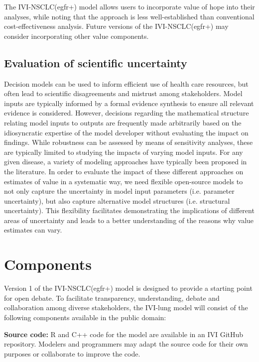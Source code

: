 \documentclass[11pt,final,fleqn]{article}\usepackage[]{graphicx}\usepackage[]{color}
\theoremstyle{plain}
\begin{document}
{The IVI-NSCLC(egfr+) model allows users to incorporate value of hope into their analyses, while noting that the approach is less well-established than conventional cost-effectiveness analysis. Future versions of the IVI-NSCLC(egfr+) may consider incorporating other value components.


\subsection{Evaluation of scientific uncertainty}
Decision models can be used to inform efficient use of health care resources, but often lead to scientific disagreements and mistrust among stakeholders. Model inputs are typically informed by a formal evidence synthesis to ensure all relevant evidence is considered. However, decisions regarding the mathematical structure relating model inputs to outputs are frequently made arbitrarily based on the idiosyncratic expertise of the model developer without evaluating the impact on findings. While robustness can be assessed by means of sensitivity analyses, these are typically limited to studying the impacts of varying model inputs. For any given disease, a variety of modeling approaches have typically been proposed in the literature. In order to evaluate the impact of these different approaches on estimates of value in a systematic way, we need flexible open-source models to not only capture the uncertainty in model input parameters (i.e. parameter uncertainty), but also capture alternative model structures (i.e. structural uncertainty). This flexibility facilitates demonstrating the implications of different areas of uncertainty and leads to a better understanding of the reasons why value estimates can vary.

\section{Components}\label{sec:components}

Version 1 of the IVI-NSCLC(egfr+) model is designed to provide a starting point for open debate. To facilitate transparency, understanding, debate and collaboration among diverse stakeholders, the IVI-lung model will consist of the following components available in the public domain:

\textbf{Source code:} R and C++ code for the model are available in an IVI GitHub repository. Modelers and programmers may adapt the source code for their own purposes or collaborate to improve the code.

}
\end{document}
